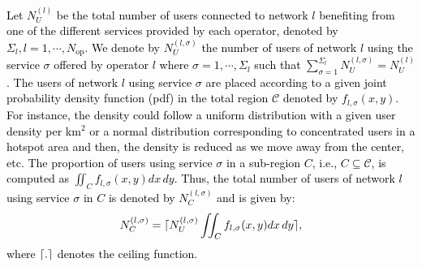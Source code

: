 \documentclass[10pt, letter, twocolumn]{IEEEtran}
\DeclarePairedDelimiter{\ceil}{\lceil}{\rceil}
\begin{document}
\textcolor{black}{Let $N_{U}^{(l)}$ be the total number of users connected to network $l$ benefiting from one of the different services provided by each operator, denoted by $\Sigma_l, l=1,\cdots,N_{\text{op}}$. We denote by $N_{U}^{(l,\sigma)}$ the number of users of network $l$ using the service $\sigma$ offered by operator $l$ where $\sigma=1,\cdots, \Sigma_l$ such that $\sum_{\sigma=1}^{\Sigma_l}N_{U}^{(l,\sigma)}=N_{U}^{(l)}$. The users of network $l$ using service $\sigma$ are placed according to a given joint probability density function (pdf) in the total region $\mathcal C$ denoted by $f_{l,\sigma}(x,y)$. For instance, the density could follow a uniform distribution with a given user density per km$^2$ or a normal distribution corresponding to concentrated users in a hotspot area and then, the density is reduced as we move away from the center, etc.
The proportion of users using service $\sigma$ in a sub-region $C$, i.e., $C \subseteq \mathcal C$, is computed as $\iint_C f_{l,\sigma}(x,y) dx\,dy$. Thus, the total number of users of network $l$ using service $\sigma$ in $C$ is denoted by $N_{C}^{(l,\sigma)}$ and is given by:
\begin{equation}
\label{Usereq}
N_{C}^{(l,\sigma)}=\ceil{N_{U}^{(l,\sigma)}\iint_C f_{l,\sigma}(x,y) dx\,dy},
\end{equation}
where $\ceil{.}$ denotes the ceiling function.}
\end{document}
